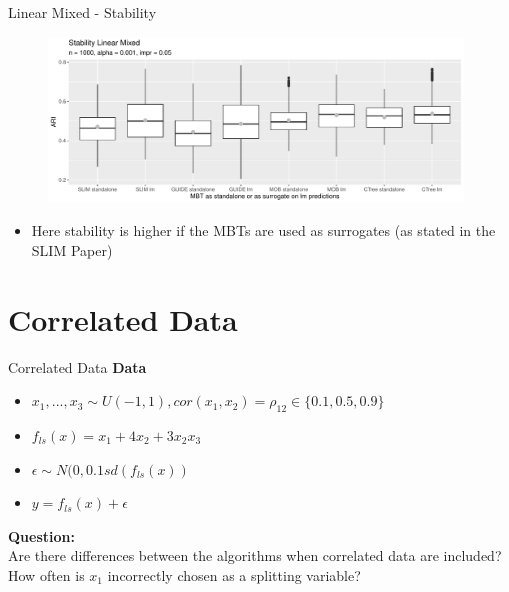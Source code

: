 \documentclass[9pt, xcolor=table]{beamer}
\begin{document}
\begin{frame}{Linear Mixed - Stability}

\begin{figure}
    \includegraphics[width=11cm]{Figures/simulations/batchtools/basic_scenarios/linear_mixed/lm_1000_standalone_lm_sta.pdf}
\end{figure}     
\begin{itemize}
    \item Here stability is higher if the MBTs are used as surrogates (as stated in the SLIM Paper)
\end{itemize}

\end{frame}


\section{Correlated Data}
\begin{frame}{Correlated Data}
\textbf{Data}
\begin{itemize}
    \item $x_1,..., x_3 \sim U(-1,1), cor(x_1,x_2) = \rho_{12} \in \{0.1, 0.5, 0.9\}$ 
    \item $ f_{ls}(x) = x_1 + 4   x_2 + 3   x_2   x_3 $
    \item $\epsilon \sim N(0, 0.1 sd(f_{ls}(x))$
    \item $y = f_{ls}(x) + \epsilon$
\end{itemize}

\textbf{Question:} \\
Are there differences between the algorithms when correlated data are included? How often is $x_1$ incorrectly chosen as a splitting variable?
    
\end{frame}
\end{document}
